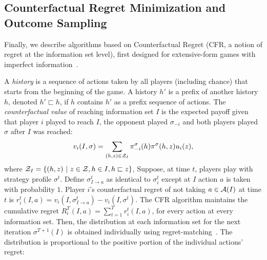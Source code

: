 \subsection{Counterfactual Regret Minimization and Outcome Sampling} \label{sec:algs:cfros}

Finally, we describe algorithms based on Counterfactual Regret (CFR, a notion of regret at the information set level),
first designed for extensive-form games with imperfect information~\cite{CFR}.

A {\it history} is a sequence of actions taken by all players (including chance) that starts from the beginning of the game.
A history $h'$ is a prefix of another history $h$, denoted $h' \sqsubset h$, if $h$ contains $h'$ as a prefix sequence of actions.
The {\it counterfactual value} of reaching information set $I$ is the expected payoff given that player $i$ played to reach $I$, the opponent played
$\sigma_{-i}$ and both players played $\sigma$ after $I$ was reached:
\begin{equation}
\label{eq:cfv}
v_i(I,\sigma) = \sum_{(h,z) \in \mathcal{Z}_I} \pi^{\sigma}_{-i}(h) \pi^{\sigma}(h,z) u_i(z),
\end{equation}
where $\mathcal{Z}_I = \{ (h,z)~|~z \in \mathcal{Z}, h \in I, h \sqsubset z \}$, 
Suppose, at time $t$, players play with strategy profile $\sigma^t$.
Define $\sigma^t_{I \rightarrow a}$ as identical to $\sigma^t_i$ except at $I$ action $a$ is taken with probability $1$.
Player $i$'s counterfactual regret of not taking $a \in \mathcal{A}(I)$ at time $t$ is $r_i^t(I,a) = v_i(I, \sigma^t_{I \rightarrow a}) - v_i(I,\sigma^t)$.
The CFR algorithm maintains the cumulative regret $R_i^T(I,a) = \sum_{t=1}^T r_i^t(I,a)$, for every action at every information set.
Then, the distribution at each information set for the next iteration $\sigma^{T+1}(I)$ is obtained individually using
regret-matching~\cite{Hart00}. The distribution is proportional to the positive portion of the individual actions' regret:
